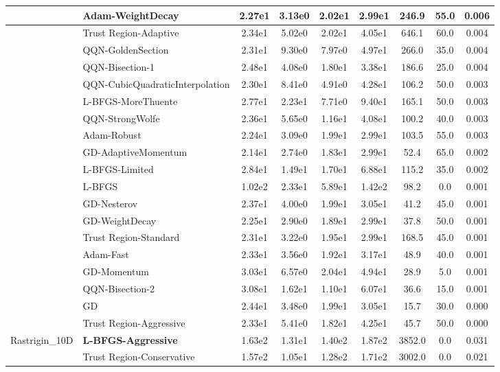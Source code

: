 \documentclass[10pt]{article}
\begin{document}
\begin{longtable}{|l|l|c|c|c|c|c|c|c|}
\hline
 & Adam-WeightDecay & 2.27e1 & 3.13e0 & 2.02e1 & 2.99e1 & 246.9 & 55.0 & 0.006 \\
\hline
 & Trust Region-Adaptive & 2.34e1 & 5.02e0 & 2.02e1 & 4.05e1 & 646.1 & 60.0 & 0.004 \\
\hline
 & QQN-GoldenSection & 2.31e1 & 9.30e0 & 7.97e0 & 4.97e1 & 266.0 & 35.0 & 0.004 \\
\hline
 & QQN-Bisection-1 & 2.48e1 & 4.08e0 & 1.80e1 & 3.38e1 & 186.6 & 25.0 & 0.004 \\
\hline
 & QQN-CubicQuadraticInterpolation & 2.30e1 & 8.41e0 & 4.91e0 & 4.28e1 & 106.2 & 50.0 & 0.003 \\
\hline
 & L-BFGS-MoreThuente & 2.77e1 & 2.23e1 & 7.71e0 & 9.40e1 & 165.1 & 50.0 & 0.003 \\
\hline
 & QQN-StrongWolfe & 2.36e1 & 5.65e0 & 1.16e1 & 4.08e1 & 100.2 & 40.0 & 0.003 \\
\hline
 & Adam-Robust & 2.24e1 & 3.09e0 & 1.99e1 & 2.99e1 & 103.5 & 55.0 & 0.003 \\
\hline
 & GD-AdaptiveMomentum & 2.14e1 & 2.74e0 & 1.83e1 & 2.99e1 & 52.4 & 65.0 & 0.002 \\
\hline
 & L-BFGS-Limited & 2.84e1 & 1.49e1 & 1.70e1 & 6.88e1 & 115.2 & 35.0 & 0.002 \\
\hline
 & L-BFGS & 1.02e2 & 2.33e1 & 5.89e1 & 1.42e2 & 98.2 & 0.0 & 0.001 \\
\hline
 & GD-Nesterov & 2.37e1 & 4.00e0 & 1.99e1 & 3.05e1 & 41.2 & 45.0 & 0.001 \\
\hline
 & GD-WeightDecay & 2.25e1 & 2.90e0 & 1.89e1 & 2.99e1 & 37.8 & 50.0 & 0.001 \\
\hline
 & Trust Region-Standard & 2.31e1 & 3.22e0 & 1.95e1 & 2.99e1 & 168.5 & 45.0 & 0.001 \\
\hline
 & Adam-Fast & 2.33e1 & 3.56e0 & 1.92e1 & 3.17e1 & 48.9 & 40.0 & 0.001 \\
\hline
 & GD-Momentum & 3.03e1 & 6.57e0 & 2.04e1 & 4.94e1 & 28.9 & 5.0 & 0.001 \\
\hline
 & QQN-Bisection-2 & 3.08e1 & 1.62e1 & 1.10e1 & 6.07e1 & 36.6 & 15.0 & 0.001 \\
\hline
 & GD & 2.44e1 & 3.48e0 & 1.99e1 & 3.05e1 & 15.7 & 30.0 & 0.000 \\
\hline
 & Trust Region-Aggressive & 2.33e1 & 5.41e0 & 1.82e1 & 4.25e1 & 45.7 & 50.0 & 0.000 \\
Rastrigin\_10D & \textbf{L-BFGS-Aggressive} & 1.63e2 & 1.31e1 & 1.40e2 & 1.87e2 & 3852.0 & 0.0 & 0.031 \\
\hline
 & Trust Region-Conservative & 1.57e2 & 1.05e1 & 1.28e2 & 1.71e2 & 3002.0 & 0.0 & 0.021 \\

\end{longtable}
\end{document}

